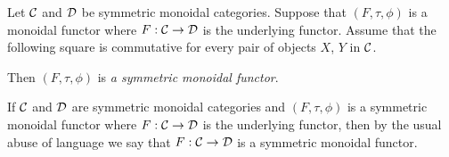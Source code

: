 \begin{definition}
Let ${\mathcal C}$ and ${\mathcal D}$ be symmetric monoidal categories. Suppose that $(F,\tau,\phi)$ is a monoidal functor where $F:{\mathcal C}\rightarrow {\mathcal D}$ is the underlying functor. Assume that the following square is commutative for every pair of objects $X$, $Y$ in ${\mathcal C}$.
\begin{center}
\end{center}
Then $(F,\tau,\phi)$ is \textit{a symmetric monoidal functor}.
\end{definition}
\noindent
If ${\mathcal C}$ and ${\mathcal D}$ are symmetric monoidal categories and $(F,\tau,\phi)$ is a symmetric monoidal functor where $F:{\mathcal C}\rightarrow {\mathcal D}$ is the underlying functor, then by the usual abuse of language we say that $F:{\mathcal C}\rightarrow {\mathcal D}$ is a symmetric monoidal functor.








































































\small




